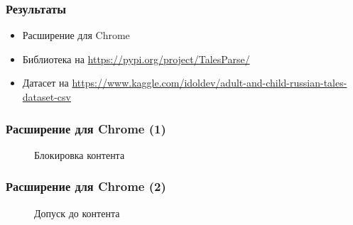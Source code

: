 \documentclass[xetex,mathserif,serif]{beamer}
\begin{document}
	\begin{frame}
		\frametitle{Результаты}
		\begin{itemize}
			\item Расширение для Chrome
			\item Библиотека на \url{https://pypi.org/project/TalesParse/}
			\item Датасет на \url{https://www.kaggle.com/idoldev/adult-and-child-russian-tales-dataset-csv}
		\end{itemize}
	\end{frame}
	
	\begin{frame}
		\frametitle{Расширение для Chrome (1)}
		\begin{figure}[h]
            \caption{Блокировка контента}
            \label{fig:image}
        \end{figure}
	\end{frame}	
	
	\begin{frame}
		\frametitle{Расширение для Chrome (2)}
		\begin{figure}[h]
            \caption{Допуск до контента}
            \label{fig:image}
        \end{figure}
	\end{frame}	
	
\end{document}
